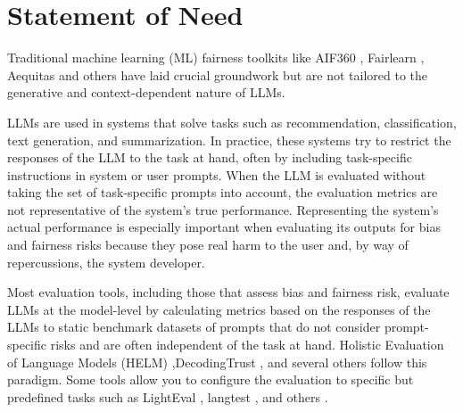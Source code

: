 \documentclass[
]{article}
\begin{document}
\section{Statement of Need}
Traditional machine learning (ML) fairness toolkits like AIF360 \cite{aif360-oct-2018}, Fairlearn \cite{Weerts_Fairlearn_Assessing_and_2023}, Aequitas \cite{2018aequitas} and others \cite{lift,DBLP:journals/corr/abs-1907-04135,tensorflow-no-date,Biecek-2018-DALEX-Explainers-for-Complex-Predictive-Models-in-R} have laid crucial groundwork but are not tailored to the generative and context-dependent nature of LLMs.

LLMs are used in systems that solve tasks such as recommendation, classification, text generation, and summarization. In practice, these systems try to restrict the responses of the LLM to the task at hand, often by including task-specific instructions in system or user prompts. When the LLM is evaluated without taking the set of task-specific prompts into account, the evaluation metrics are not representative of the system's true performance. Representing the system's actual performance is especially important when evaluating its outputs for bias and fairness risks because they pose real harm to the user and, by way of repercussions, the system developer.

Most evaluation tools, including those that assess bias and fairness risk, evaluate LLMs at the model-level by calculating metrics based on the responses of the LLMs to static benchmark datasets of prompts \cite{rudinger-EtAl:2018:N18,zhao-2018,vnmssnhv-no-date,webster2018gap, levy2021collecting,nadeem2020stereoset,bartl2020unmasking,nangia2020crows,katyfelkner-no-date,umanlp-no-date,unknown-author-no-date,dev2019measuring,Gehman2020RealToxicityPromptsEN,bold_2021,smith2022imsorry,howiehwong-no-date,nozza-etal-2021-honest,nyu-mll-no-date,li2020unqover,krieg2022grep} that do not consider prompt-specific risks and are often independent of the task at hand. Holistic Evaluation of Language Models (HELM) \cite{liang2023holisticevaluationlanguagemodels},DecodingTrust \cite{wang2023decodingtrust}, and several others \cite{srivastava2023beyond,huang2024trustllm,eval-harness} follow this paradigm. Some tools allow you to configure the evaluation to specific but predefined tasks such as LightEval \cite{lighteval}, langtest \cite{Arshaan_Nazir_and_Thadaka_Kalyan_Chakravarthy_and_David_Amore_Cecchini_and_Thadaka_Kalyan_Chakravarthy_and_Rakshit_Khajuria_and_Prikshit_Sharma_and_Ali_Tarik_Mirik_and_Veysel_Kocaman_and_David_Talby_LangTest_A_comprehensive_2024}, and others \cite{confident-ai-no-date,giskard-ai-no-date,huggingface-no-date}. 
\end{document}
